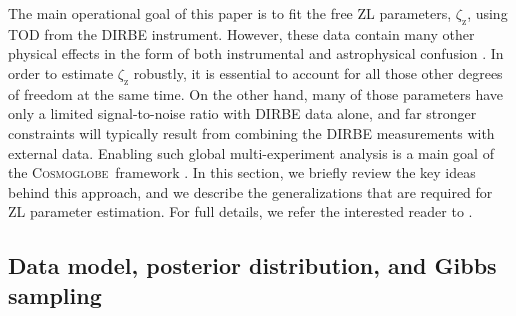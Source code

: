 \documentclass[twocolumn]{aa}
\newcommand{\cosmoglobe}{\textsc{Cosmoglobe}}
\begin{document}
The main operational goal of this paper is to fit the free ZL
parameters, $\zeta_{\mathrm{z}}$, using TOD from the
DIRBE instrument. However, these data contain many other physical
effects in the form of both instrumental and astrophysical confusion
\citep[e.g.,][]{hauser1998,arendt1998}. In order to estimate
$\zeta_{\mathrm{z}}$ robustly, it is essential to account for all
those other degrees of freedom at the same time. On the other hand,
many of those parameters have only a limited signal-to-noise ratio
with DIRBE data alone, and far stronger constraints will typically
result from combining the DIRBE measurements with external
data. Enabling such global multi-experiment analysis is a main goal of
the \cosmoglobe\ framework \citep{Watts2023}. In this section, we briefly review the key
ideas behind this approach, and we describe the generalizations that
are required for ZL parameter estimation. For full details, we refer
the interested reader to \citet{CG02_01}. 


\subsection{Data model, posterior distribution, and Gibbs sampling}
\label{sec:gibbs}
\end{document}
